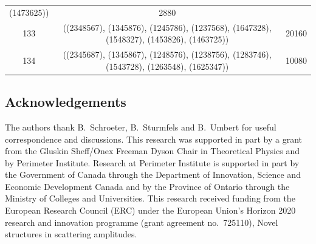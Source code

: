 \documentclass[pdftex]{sigma}
\theoremstyle{definition}
\numberwithin{equation}{section}
\begin{document}
\begin{center}
\begin{longtable}{|@{\,}c@{\,}|@{\,}c@{\,}|@{\,}c@{\,}|}
(1473625)) & 2880 \\ 133 & ((2348567), (1345876), (1245786), (1237568), (1647328), (1548327), (1453826), (1463725)) & 20160 \\ 134 & ((2345687), (1345867), (1248576), (1238756), (1283746), (1543728), (1263548), (1625347)) & 10080

\end{longtable}\vspace{-2mm}

\end{center}

\subsection*{Acknowledgements}

The authors thank B.~Schroeter, B.~Sturmfels and B.~Umbert for useful correspondence and discussions. This research was supported in part by a grant from the Gluskin Sheff/Onex Freeman Dyson Chair in Theoretical Physics and by Perimeter Institute. Research at Perimeter Institute is supported in part by the Government of Canada through the Department of Innovation, Science and Economic Development Canada and by the Province of Ontario through the Ministry of Colleges and Universities. This research received funding from the European Research Council (ERC) under the European Union's Horizon 2020 research and innovation programme (grant agreement no.~725110), Novel structures in scattering amplitudes.
\end{document}
